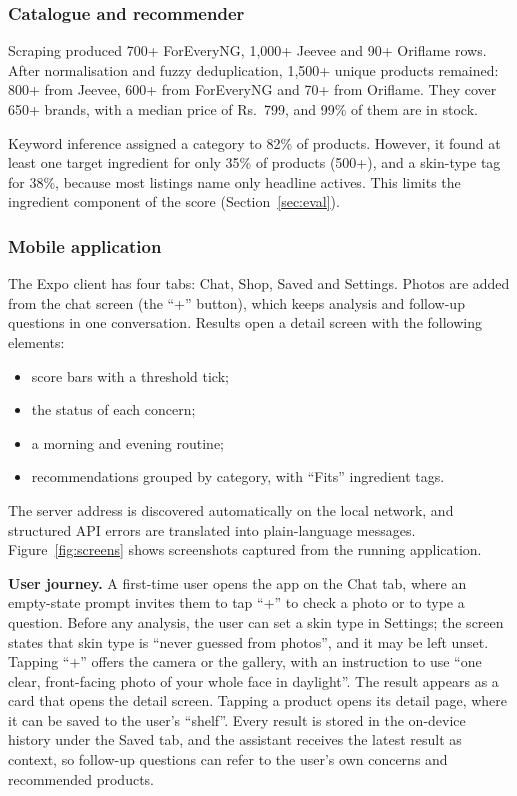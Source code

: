 \subsubsection*{Catalogue and recommender}

Scraping produced 700+ ForEveryNG, 1,000+ Jeevee and 90+ Oriflame rows. After normalisation and fuzzy deduplication, 1,500+ unique products remained: 800+ from Jeevee, 600+ from ForEveryNG and 70+ from Oriflame. They cover 650+ brands, with a median price of Rs.~799, and 99\% of them are in stock.

Keyword inference assigned a category to 82\% of products. However, it found at least one target ingredient for only 35\% of products (500+), and a skin-type tag for 38\%, because most listings name only headline actives. This limits the ingredient component of the score (Section~\ref{sec:eval}).

\subsubsection*{Mobile application}

The Expo client has four tabs: Chat, Shop, Saved and Settings. Photos are added from the chat screen (the ``+'' button), which keeps analysis and follow-up questions in one conversation. Results open a detail screen with the following elements:
\begin{itemize}
  \item score bars with a threshold tick;
  \item the status of each concern;
  \item a morning and evening routine;
  \item recommendations grouped by category, with ``Fits'' ingredient tags.
\end{itemize}
The server address is discovered automatically on the local network, and structured API errors are translated into plain-language messages. Figure~\ref{fig:screens} shows screenshots captured from the running application.

\textbf{User journey.} A first-time user opens the app on the Chat tab, where an empty-state prompt invites them to tap ``+'' to check a photo or to type a question. Before any analysis, the user can set a skin type in Settings; the screen states that skin type is ``never guessed from photos'', and it may be left unset. Tapping ``+'' offers the camera or the gallery, with an instruction to use ``one clear, front-facing photo of your whole face in daylight''. The result appears as a card that opens the detail screen. Tapping a product opens its detail page, where it can be saved to the user's ``shelf''. Every result is stored in the on-device history under the Saved tab, and the assistant receives the latest result as context, so follow-up questions can refer to the user's own concerns and recommended products.

